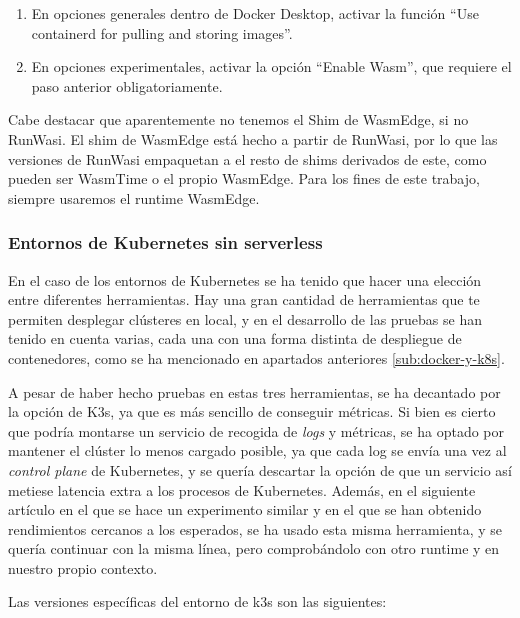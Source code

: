 \begin{enumerate}
    \item En opciones generales dentro de Docker Desktop, activar la función “Use containerd for pulling and storing images”.
    
    \item En opciones experimentales, activar la opción “Enable Wasm”, que requiere el paso anterior obligatoriamente.  
\end{enumerate}

Cabe destacar que aparentemente no tenemos el Shim de WasmEdge, si no RunWasi. El shim de WasmEdge está hecho a partir de RunWasi, por lo que las versiones de RunWasi empaquetan a el resto de shims derivados de este, como pueden ser WasmTime o el propio WasmEdge. Para los fines de este trabajo, siempre usaremos el runtime WasmEdge.

\subsubsection{Entornos de Kubernetes sin serverless}

En el caso de los entornos de Kubernetes se ha tenido que hacer una elección entre diferentes herramientas. Hay una gran cantidad de herramientas que te permiten desplegar clústeres en local, y en el desarrollo de las pruebas se han tenido en cuenta varias, cada una con una forma distinta de despliegue de contenedores, como se ha mencionado en apartados anteriores \ref{sub:docker-y-k8s}.

A pesar de haber hecho pruebas en estas tres herramientas, se ha decantado por la opción de K3s, ya que es más sencillo de conseguir métricas. Si bien es cierto que podría montarse un servicio de recogida de \textit{logs} y métricas, se ha optado por mantener el clúster lo menos cargado posible, ya que cada log se envía una vez al \textit{control plane} de Kubernetes, y se quería descartar la opción de que un servicio así metiese latencia extra a los procesos de Kubernetes. Además, en el siguiente artículo en el que se hace un experimento similar \cite{Kjorveziroski2023} y en el que se han obtenido rendimientos cercanos a los esperados, se ha usado esta misma herramienta, y se quería continuar con la misma línea, pero comprobándolo con otro runtime y en nuestro propio contexto.

Las versiones específicas del entorno de k3s son las siguientes:

